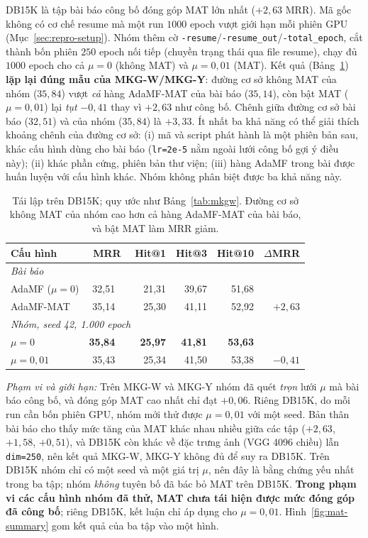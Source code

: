 \documentclass[conference]{IEEEtran}
\renewcommand{\hl}[1]{#1}
\begin{document}
\label{sec:db15k}
DB15K là tập bài báo công bố đóng góp MAT lớn nhất ($+2{,}63$ MRR). Mã gốc không có cơ chế
resume mà một run $1000$ epoch vượt giới hạn mỗi phiên GPU (Mục~\ref{sec:repro-setup}). Nhóm
thêm cờ \texttt{-resume}/\texttt{-resume\_out}/\texttt{-total\_epoch}, cắt thành bốn phiên
$250$ epoch nối tiếp (chuyền trạng thái qua file resume), chạy đủ $1000$ epoch cho
cả $\mu=0$ (không MAT) và $\mu=0{,}01$ (MAT). Kết quả (Bảng~\ref{tab:db15k}) \textbf{lặp lại đúng mẫu của MKG-W/MKG-Y}:
đường cơ sở không MAT của nhóm ($35{,}84$) vượt \emph{cả} hàng AdaMF-MAT của bài báo
($35{,}14$), còn bật MAT ($\mu=0{,}01$) lại \emph{tụt} $-0{,}41$ thay vì $+2{,}63$ như công bố. Chênh giữa đường cơ sở bài báo ($32{,}51$) và của nhóm ($35{,}84$) là
$+3{,}33$. Ít nhất ba khả năng có thể giải thích khoảng chênh của đường cơ sở: (i) mã và script
phát hành là một phiên bản sau, khác cấu hình dùng cho bài báo (\texttt{lr=2e-5} nằm ngoài lưới công
bố gợi ý điều này); (ii) khác phần cứng, phiên bản thư viện; (iii) hàng AdaMF trong bài được huấn
luyện với cấu hình khác. Nhóm không phân biệt được ba khả năng này.

\begin{table}[t]
\caption{Tái lập trên DB15K; quy ước như Bảng~\ref{tab:mkgw}. Đường cơ sở không MAT của nhóm cao hơn cả hàng AdaMF-MAT
của bài báo, và bật MAT làm MRR giảm.}
\label{tab:db15k}
\centering\footnotesize
\setlength{\tabcolsep}{3pt}
\begin{tabular}{lr@{\,}lrrrr}
\toprule
Cấu hình & \multicolumn{2}{c}{MRR} & Hit@1 & Hit@3 & Hit@10 & $\Delta$MRR \\
\midrule
\multicolumn{7}{l}{\emph{Bài báo~\cite{adamfmat}}} \\
AdaMF ($\mu{=}0$) & 32,51 & & 21,31 & 39,67 & 51,68 & \\
AdaMF-MAT & 35,14 & & 25,30 & 41,11 & 52,92 & $+2{,}63$ \\
\midrule
\multicolumn{7}{l}{\emph{Nhóm, seed 42, 1.000 epoch}} \\
$\mu{=}0$ & \textbf{35,84} & & \textbf{25,97} & \textbf{41,81} & \textbf{53,63} & \\
$\mu{=}0{,}01$ & 35,43 & & 25,34 & 41,50 & 53,38 & $-0{,}41$ \\
\bottomrule
\end{tabular}
\end{table}

\emph{Phạm vi và giới hạn:} Trên MKG-W và MKG-Y nhóm đã quét \emph{trọn} lưới $\mu$ mà bài báo
công bố, và đóng góp MAT cao nhất chỉ đạt $+0{,}06$. Riêng DB15K, do mỗi run cần bốn phiên GPU, nhóm
mới thử được $\mu=0{,}01$ với một seed. Bản thân bài báo cho thấy mức tăng của MAT khác nhau nhiều
giữa các tập ($+2{,}63$, $+1{,}58$, $+0{,}51$), và DB15K còn khác về đặc trưng ảnh (VGG 4096 chiều) lẫn
\texttt{dim=250}, nên kết quả MKG-W, MKG-Y không đủ để suy ra DB15K. Trên DB15K nhóm chỉ có một seed
và một giá trị $\mu$, nên đây là bằng chứng yếu nhất trong ba tập; nhóm \emph{không} tuyên bố đã bác
bỏ MAT trên DB15K. \textbf{\hl{Trong} phạm vi các
cấu hình nhóm đã thử, MAT chưa tái hiện được mức đóng góp đã công bố}; riêng DB15K, kết luận chỉ
áp dụng cho $\mu=0{,}01$. Hình~\ref{fig:mat-summary} gom kết quả của ba tập vào một hình.
\end{document}
